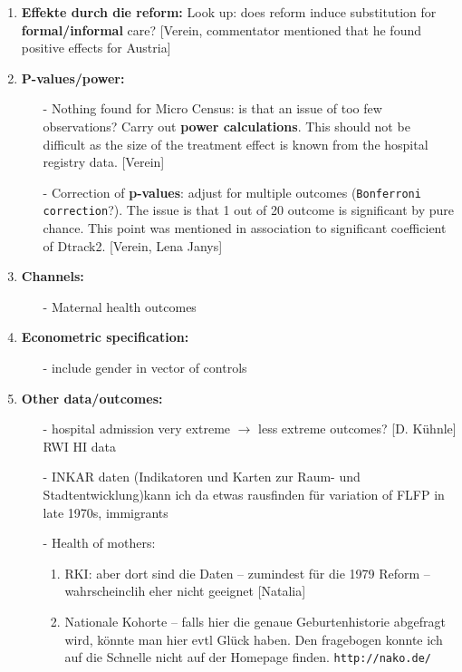 \documentclass[11pt,a4paper]{article}
\begin{document}
\begin{enumerate}
\item \textbf{Effekte durch die reform:}\newline
Look up: does reform induce substitution for \textbf{formal/informal} care? [Verein, commentator mentioned that he found positive effects for Austria] 


\item \textbf{P-values/power:}\vspace{-1em}
\begin{itemize}
\item[-] Nothing found for Micro Census: is that an issue of too few observations? Carry out \textbf{power calculations}. This should not be difficult as the size of the treatment effect is known from the hospital registry data. [Verein]
	\item[-] Correction of \textbf{p-values}: adjust for multiple outcomes (\texttt{Bonferroni correction}?). The issue is that 1 out of 20 outcome is significant by pure chance. This point was mentioned in association to significant coefficient of Dtrack2. [Verein, Lena Janys]
\end{itemize}


\item \textbf{Channels:}\vspace{-1em}
\begin{itemize}
\item[-] Maternal health outcomes
\end{itemize}


\item \textbf{Econometric specification:}\vspace{-1em}
\begin{itemize}
\item[-] include gender in vector of controls
\end{itemize}


\item \textbf{Other data/outcomes:}\vspace{-1 em}
\begin{itemize}
\item[-] hospital admission very extreme $\rightarrow$ less extreme outcomes? [D. Kühnle] RWI HI data
\item[-] INKAR daten (Indikatoren und Karten zur Raum- und Stadtentwicklung)\newline kann ich da etwas rausfinden für variation of FLFP in late 1970s, immigrants 
\item[-] Health of mothers: \vspace{-.5em}
\begin{enumerate}
\item RKI: aber dort sind die Daten – zumindest für die 1979 Reform – wahrscheinclih eher nicht geeignet [Natalia]
\item  Nationale Kohorte – falls hier die genaue Geburtenhistorie abgefragt wird, könnte man hier evtl Glück haben. Den fragebogen konnte ich auf die Schnelle nicht auf der Homepage finden. \texttt{http://nako.de/}
\end{enumerate}
\end{itemize}



\end{enumerate}
\end{document}
